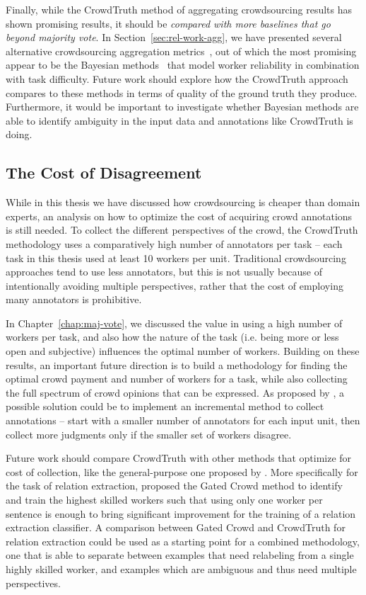 Finally, while the CrowdTruth method of aggregating crowdsourcing results has shown promising results, it should be \textit{compared with more baselines that go beyond majority vote}. In Section~\ref{sec:rel-work-agg}, we have presented several alternative crowdsourcing aggregation metrics~\cite{welinder2010multidimensional,werling2015job,NIPS2009_3644,Bozzon:2013,Kittur2008,Ipeirotis:2010}, out of which the most promising appear to be the Bayesian methods~\cite{paun2018comparing} that model worker reliability in combination with task difficulty. Future work should explore how the CrowdTruth approach compares to these methods in terms of quality of the ground truth they produce. Furthermore, it would be important to investigate whether Bayesian methods are able to identify ambiguity in the input data and annotations like CrowdTruth is doing.


\subsection{The Cost of Disagreement}

While in this thesis we have discussed how crowdsourcing is cheaper than domain experts, an analysis on how to optimize the cost of acquiring crowd annotations is still needed. To collect the different perspectives of the crowd, the CrowdTruth methodology uses a comparatively high number of annotators per task -- each task in this thesis used at least 10 workers per unit. Traditional crowdsourcing approaches tend to use less annotators, but this is not usually because of intentionally avoiding multiple perspectives, rather that the cost of employing many annotators is prohibitive.

In Chapter~\ref{chap:maj-vote}, we discussed the value in using a high number of workers per task, and also how the nature of the task (i.e. being more or less open and subjective) influences the optimal number of workers. Building on these results, an important future direction is to build a methodology for finding the optimal crowd payment and number of workers for a task, while also collecting the full spectrum of crowd opinions that can be expressed. As proposed by \citet{lin2014re}, a possible solution could be to implement an incremental method to collect annotations -- start with a smaller number of annotators for each input unit, then collect more judgments only if the smaller set of workers disagree.

Future work should compare CrowdTruth with other methods that optimize for cost of collection, like the general-purpose one proposed by \citet{Mizusawa:2018:EPP:3269206.3269292}. More specifically for the task of relation extraction, \citet{liu2016effective} proposed the Gated Crowd method to identify and train the highest skilled workers such that using only one worker per sentence is enough to bring significant improvement for the training of a relation extraction classifier. A comparison between Gated Crowd and CrowdTruth for relation extraction could be used as a starting point for a combined methodology, one that is able to separate between examples that need relabeling from a single highly skilled worker, and examples which are ambiguous and thus need multiple perspectives.


